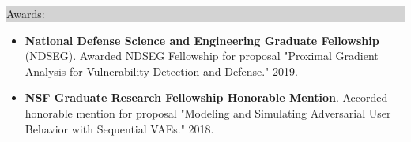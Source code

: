 \documentclass{article} %
\newcommand{\rsection}[1]{
  \hspace{-0.4cm}\vspace{0.1cm}
\colorbox{lightgrey}{
\begin{minipage}{1.07\linewidth}
\vspace{0.22cm}
\fontsize{14pt}{16pt}\selectfont #1
\vspace{0.12cm}
\end{minipage}
}
\vspace*{-0.1cm}
}
\newcommand{\rjob}[2]{
  \hspace*{-0.3cm}
{\fontsize{10pt}{12pt}\selectfont #1} \hfill #2
\vspace*{0.1cm}
\hspace*{-1.2cm}
}
\newenvironment{ritemize}{
\hspace*{-0.8cm}
\begin{minipage}{1.05\linewidth}
\begin{itemize}
}{
\end{itemize}
\end{minipage}
}
\newcommand{\ritem}{
\item[-]
}
\begin{document}
\rsection{Awards:}
\hspace*{-0.1cm}
\begin{minipage}{1.01\linewidth}
\begin{itemize}[label={},itemindent=-2em,leftmargin=2em, parsep=4pt]
  \item {\bf National Defense Science and Engineering Graduate Fellowship} (NDSEG). Awarded NDSEG Fellowship for proposal "Proximal Gradient Analysis for Vulnerability Detection and Defense." 2019.
  \item {\bf NSF Graduate Research Fellowship Honorable Mention}. Accorded honorable mention for proposal "Modeling and Simulating Adversarial User Behavior with Sequential VAEs." 2018.
  \end{itemize}
\end{minipage}






\end{document}
